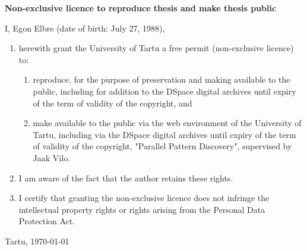 \newpage

\textbf{Non-exclusive licence to reproduce thesis and make thesis public}

I, Egon Elbre (date of birth: July 27, 1988),
\begin{enumerate}
	\item herewith grant the University of Tartu a free permit (non-exclusive licence) to:
	\begin{enumerate}
		\item reproduce, for the purpose of preservation and making available to the public, including for addition to the DSpace digital archives until expiry of the term of validity of the copyright, and
		\item make available to the public via the web environment of the University of Tartu, including via the DSpace digital archives until expiry of the term of validity of the copyright, "Parallel Pattern Discovery", supervised by Jaak Vilo.
	\end{enumerate}
	\item I am aware of the fact that the author retains these rights.
	\item I certify that granting the non-exclusive licence does not infringe the intellectual property rights or rights arising from the Personal Data Protection Act.
\end{enumerate}

Tartu, \today